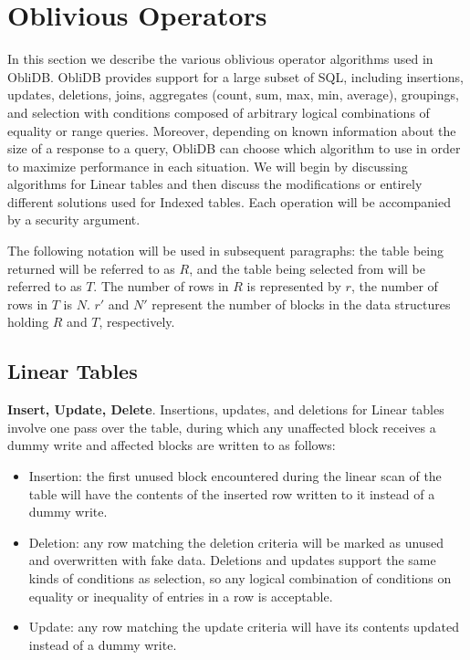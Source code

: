 \documentclass[letterpaper,twocolumn,10pt]{article}
\def\name/{ObliDB}
\begin{document}
\section{Oblivious Operators}\label{oblivOps}
In this section we describe the various oblivious operator algorithms used in \name/. \name/ provides support for a large subset of SQL, including insertions, updates, deletions, joins, aggregates (count, sum, max, min, average), groupings, and selection with conditions composed of arbitrary logical combinations of equality or range queries. Moreover, depending on known information about the size of a response to a query, \name/ can choose which algorithm to use in order to maximize performance in each situation. We will begin by discussing algorithms for Linear tables and then discuss the modifications or entirely different solutions used for Indexed tables. Each operation will be accompanied by a security argument. 

The following notation will be used in subsequent paragraphs: the table being returned will be referred to as $R$, and the table being selected from will be referred to as $T$. The number of rows in $R$ is represented by $r$, the number of rows in $T$ is $N$. $r'$ and $N'$ represent the number of blocks in the data structures holding $R$ and $T$, respectively. 

\subsection{Linear Tables}
  \noindent \textbf{Insert, Update, Delete}. 
Insertions, updates, and deletions for Linear tables involve one pass over the table, during which any unaffected block receives a dummy write and affected blocks are written to as follows:
\begin{itemize}[itemsep=0pt,parsep=0pt]
\item Insertion: the first unused block encountered during the linear scan of the table will have the contents of the inserted row written to it instead of a dummy write.
\item Deletion: any row matching the deletion criteria will be marked as unused and overwritten with fake data. Deletions and updates support the same kinds of conditions as selection, so any logical combination of conditions on equality or inequality of entries in a row is acceptable. 
\item Update: any row matching the update criteria will have its contents updated instead of a dummy write. 
\end{itemize}
\end{document}
